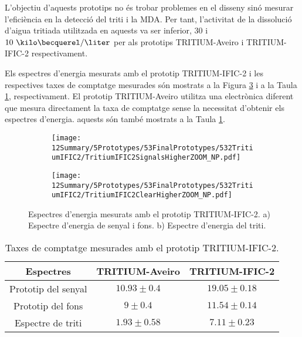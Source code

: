 L'objectiu d'aquests prototips no és trobar problemes en el disseny sinó mesurar l'eficiència en la detecció del triti i la MDA. Per tant, l'activitat de la dissolució d'aigua tritiada utilitzada en aquests va ser inferior, $30$ i $10~\kilo\becquerel/\liter$ per als prototips TRITIUM-Aveiro i TRITIUM-IFIC-2 respectivament.

Els espectres d'energia mesurats amb el prototip TRITIUM-IFIC-2 i les respectives taxes de comptatge mesurades són  mostrats a la Figura \ref{fig:EspectresEnergeticsTRITIUMIFIC2} i a la Taula \ref{tab:ContesPerSegonTRITIUMIFIC2}, respectivament. El prototip TRITIUM-Aveiro utilitza una electrònica diferent que mesura directament la taxa de comptatge sense la necessitat d'obtenir els espectres d'energia. aquests són també mostrats a la Taula \ref{tab:ContesPerSegonTRITIUMIFIC2}.

\begin{figure}
\centering
    \begin{subfigure}[b]{1\textwidth}
    \centering
    \texttt{[image: 12Summary/5Prototypes/53FinalPrototypes/532TritiumIFIC2/TritiumIFIC2SignalsHigherZOOM\_NP.pdf]}  
    \caption{\label{subfig:EspectreEnergeticSenyalFonsTritiumIFIC2}}
    \end{subfigure}
    \hfill
    \begin{subfigure}[b]{1\textwidth}
    \centering
    \texttt{[image: 12Summary/5Prototypes/53FinalPrototypes/532TritiumIFIC2/TritiumIFIC2ClearHigherZOOM\_NP.pdf]}  
    \caption{\label{subfig:EspectreEnergeticTritiTritiumIFIC2}}
    \end{subfigure}
 \caption{Espectres d'energia mesurats amb el prototip TRITIUM-IFIC-2. a) Espectre d'energia de senyal i fons. b) Espectre d'energia del triti.}
 \label{fig:EspectresEnergeticsTRITIUMIFIC2}
\end{figure}

\begin{table}[htbp]
\centering{}%
\begin{tabular}{ccc}
\toprule 
Espectres & TRITIUM-Aveiro & TRITIUM-IFIC-2  \tabularnewline
\midrule
\midrule 
Prototip del senyal & $10.93 \pm 0.4$ & $19.05 \pm 0.18$ \tabularnewline
Prototip del fons & $9 \pm 0.4$ & $11.54 \pm 0.14$ \tabularnewline  
Espectre de triti & $1.93 \pm 0.58$ & $7.11 \pm 0.23$ \tabularnewline
\bottomrule
\end{tabular}
\caption{Taxes de comptatge mesurades amb el prototip TRITIUM-IFIC-2.}
\label{tab:ContesPerSegonTRITIUMIFIC2}
\end{table}

